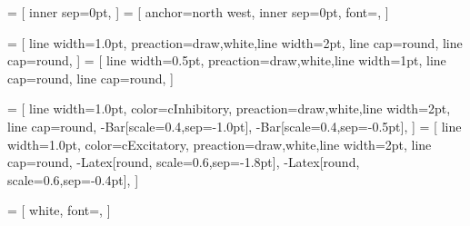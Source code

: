 \usepackage{tikz}
\usepackage{svg}

\usetikzlibrary{shapes.geometric}
\usetikzlibrary{arrows.meta}
\usetikzlibrary{positioning}
\usetikzlibrary{calc}
\usetikzlibrary{backgrounds}
\usetikzlibrary{fit}
\usetikzlibrary{fadings}
\usetikzlibrary{decorations}

\renewcommand{\familydefault}{\sfdefault}
\usepackage{sansmathfonts}

\usepackage{rotating}



 = [
    inner sep=0pt,
]
 = [
    anchor=north west,
    inner sep=0pt,
    font={\bfseries\sffamily},
]

 = [
    line width=1.0pt,
    preaction={draw,white,line width=2pt, line cap=round},
    line cap=round,
    ]
 = [
    line width=0.5pt,
    preaction={draw,white,line width=1pt, line cap=round},
    line cap=round,
    ]

 = [
    line width=1.0pt,
    color=cInhibitory,
    preaction={draw,white,line width=2pt, line cap=round, -{Bar[scale=0.4,sep=-1.0pt]}},
    -{Bar[scale=0.4,sep=-0.5pt]},
    ]
 = [
    line width=1.0pt,
    color=cExcitatory,
    preaction={draw,white,line width=2pt, line cap=round, -{Latex[round, scale=0.6,sep=-1.8pt]}},
    -{Latex[round, scale=0.6,sep=-0.4pt]},
    ]

 = [
    white,
    font=\sffamily\small,
    ]

